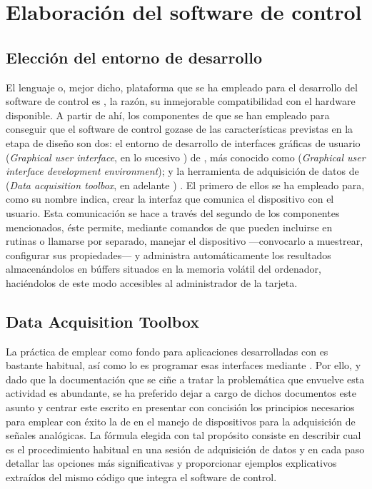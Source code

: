 \section{Elaboración del software de control}


\subsection{Elección del entorno de desarrollo}\label{subsec:environment}

El lenguaje o, mejor dicho, plataforma que se ha empleado para el
desarrollo del software de control es \matlab{}, la razón, su inmejorable
compatibilidad con el hardware disponible. A partir de ahí, los componentes
de \matlab{} que se han empleado para conseguir que el software de control
gozase de las características previstas en la etapa de diseño son dos: el
entorno de desarrollo de interfaces gráficas de usuario (\emph{Graphical
user interface}, en lo sucesivo ) de \matlab{}, más conocido como
 (\emph{Graphical user interface development environment}); y
la herramienta de adquisición de datos de \matlab{} (\emph{Data acquisition
toolbox}, en adelante ) . El primero de ellos se ha empleado
para, como su nombre indica, crear la interfaz que comunica el dispositivo
con el usuario. Esta comunicación se hace a través del segundo de los
componentes mencionados, éste permite, mediante comandos de \matlab{} que
pueden incluirse en rutinas o llamarse por separado, manejar el dispositivo
---convocarlo a muestrear, configurar sus propiedades--- y administra
automáticamente los resultados almacenándolos en búffers situados en la
memoria volátil del ordenador, haciéndolos de este modo accesibles al
administrador de la tarjeta.


\subsection{Data Acquisition Toolbox}

La práctica de emplear \gui{} como fondo para aplicaciones desarrolladas
con \matlab{} es bastante habitual, así como lo es programar esas
interfaces mediante \guide{}. Por ello, y dado que la documentación que se
ciñe a tratar la problemática que envuelve esta actividad es abundante, se
ha preferido dejar a cargo de dichos documentos este asunto y centrar este
escrito en presentar con concisión los principios necesarios para emplear
con éxito la \datx{} de \matlab{} en el manejo de dispositivos para la
adquisición de señales analógicas. La fórmula elegida con tal propósito
consiste en describir cual es el procedimiento habitual en una sesión de
adquisición de datos y en cada paso detallar las opciones más
significativas y proporcionar ejemplos explicativos extraídos del mismo
código que integra el software de control.

